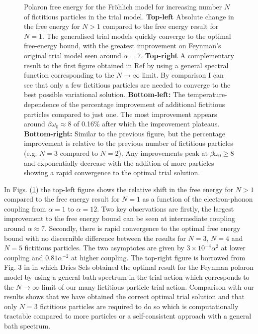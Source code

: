 \begin{figure}[!tbp]
  \caption{Polaron free energy for the Fr\"ohlich model for increasing number $N$ of fictitious particles in the trial model. \textbf{Top-left} Absolute change in the free energy for $N>1$ compared to the free energy result for $N=1$. The generalised trial models quickly converge to the optimal free-energy bound, with the greatest improvement on Feynman's original trial model seen around $\alpha = 7$. \textbf{Top-right} A complementary result to the first figure obtained in Ref{} by using a general spectral function corresponding to the $N\to\infty$ limit. By comparison I can see that only a few fictitious particles are needed to converge to the best possible variational solution. \textbf{Bottom-left:} The temperature-dependence of the percentage improvement of additional fictitious particles compared to just one. The most improvement appears around $\beta\omega_0 \approx 8$ of 0.16\% after which the improvement plateaus. \textbf{Bottom-right:} Similar to the previous figure, but the percentage improvement is relative to the previous number of fictitious particles (e.g. $N=3$ compared to $N=2$). Any improvements peak at $\beta\omega_0 \geq 8$ and exponentially decrease with the addition of more particles showing a rapid convergence to the optimal trial solution.}
  \label{fig:multienergy}
\end{figure}

In Figs. (\ref{fig:multienergy}) the top-left figure shows the relative shift in the free energy for $N>1$ compared to the free energy result for $N=1$ as a function of the electron-phonon coupling from $\alpha=1$ to $\alpha=12$. Two key observations are firstly, the largest improvement to the free energy bound can be seen at intermediate coupling around $\alpha \approx 7$. Secondly, there is rapid convergence to the optimal free energy bound with no discernible difference between the results for $N=3$, $N=4$ and $N=5$ fictitious particles. The two asymptotes are given by $3 \times 10^{-4} \alpha^2$ at lower coupling and $0.81 \alpha^{-2}$ at higher coupling. The top-right figure is borrowed from Fig. 3 in \cite{Dries2016} in which Dries Sels obtained the optimal result for the Feynman polaron model by using a general bath spectrum in the trial action which corresponds to the $N\to\infty$ limit of our many fictitious particle trial action. Comparison with our results shows that we have obtained the correct optimal trial solution and that only $N=3$ fictitious particles are required to do so which is computationally tractable compared to more particles or a self-consistent approach with a general bath spectrum.
\newline


